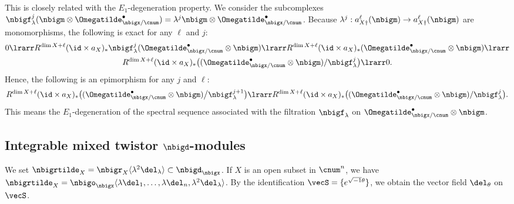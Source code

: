\documentclass[a4,10pt]{article}
\begin{document}
This is closely related with the $E_1$-degeneration property.
We consider the subcomplexes
$\nbigf_{\lambda}^j(\nbigm\otimes\Omegatilde^{\bullet}_{\nbigx/\cnum})
=\lambda^j\nbigm\otimes\Omegatilde^{\bullet}_{\nbigx/\cnum}$.
Because
$\lambda^j:a^{\ell}_{X\dagger}(\nbigm)
\to
 a^{\ell}_{X\dagger}(\nbigm)$
are monomorphisms,
the following is exact for any $\ell$ and $j$:
\begin{multline}
 0\lrarr
 R^{\dim X+\ell}(\id\times a_X)_{\ast}
 \nbigf_{\lambda}^j(\Omegatilde^{\bullet}_{\nbigx/\cnum}\otimes\nbigm)
 \lrarr
  R^{\dim X+\ell}(\id\times a_X)_{\ast}
 (\Omegatilde^{\bullet}_{\nbigx/\cnum}\otimes\nbigm)
 \lrarr
 \\
 R^{\dim X+\ell}(\id\times a_X)_{\ast}
 \bigl(
 (\Omegatilde^{\bullet}_{\nbigx/\cnum}\otimes\nbigm)/\nbigf_{\lambda}^j
 \bigr)
 \lrarr 0.
\end{multline}
Hence, the following is an epimorphism
for any $j$ and $\ell$:
\begin{equation}
 R^{\dim X+\ell}(\id\times a_X)_{\ast}
 \bigl(
 (\Omegatilde^{\bullet}_{\nbigx/\cnum}\otimes\nbigm)
 \big/\nbigf_{\lambda}^{j+1}
 \bigr)
 \lrarr
  R^{\dim X+\ell}(\id\times a_X)_{\ast}\bigl(
 (\Omegatilde^{\bullet}_{\nbigx/\cnum}\otimes \nbigm)/\nbigf_{\lambda}^j
 \bigr).
\end{equation}
This means the $E_1$-degeneration
of the spectral sequence associated with the filtration
$\nbigf_{\lambda}$
on $\Omegatilde^{\bullet}_{\nbigx/\cnum}\otimes\nbigm$.

\subsection{Integrable mixed twistor $\nbigd$-modules}

We set
$\nbigrtilde_X=\nbigr_X\langle\lambda^2\del_{\lambda}\rangle
\subset\nbigd_{\nbigx}$.
If $X$ is an open subset in $\cnum^n$,
we have
$\nbigrtilde_X=\nbigo_{\nbigx}
\langle \lambda\del_1,\ldots,\lambda\del_n,
\lambda^2\del_{\lambda}\rangle$.
By the identification $\vecS=\{e^{\sqrt{-1}\theta}\}$,
we obtain the vector field $\del_{\theta}$ on $\vecS$.
\end{document}
